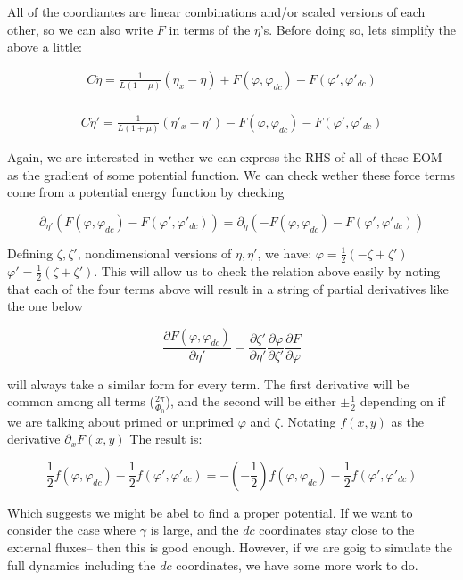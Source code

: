 \documentclass[paper=a4, twocolumn, fontsize=10pt]{article} %
\numberwithin{equation}{section} %
\numberwithin{figure}{section} %
\numberwithin{table}{section} %
\begin{document}
All of the coordiantes are linear combinations and/or scaled versions of each other, so we can also write $F$ in terms of the $\eta$'s. Before doing so, lets simplify the above a little: 

\begin{multline}
    C \ddot{\eta} = \frac{1}{L(1-\mu)} (\eta_x-\eta) + F(\varphi, \varphi_{dc}) - F(\varphi', \varphi'_{dc})
\end{multline}
    \\
\begin{multline}
    C \ddot{\eta}' = \frac{1}{L(1+\mu)} (\eta'_x-\eta') - F(\varphi, \varphi_{dc}) - F(\varphi', \varphi'_{dc})
\end{multline}

Again, we are interested in wether we can express the RHS of all of these EOM as the gradient of some potential function. We can check wether these force terms come from a potential energy function by checking

\[ \partial_{\eta'} \left( F(\varphi, \varphi_{dc}) - F(\varphi', \varphi'_{dc})\right) = \partial_{\eta} \left( -F(\varphi, \varphi_{dc}) - F(\varphi', \varphi'_{dc})\right) \]


Defining $\zeta,\zeta'$, nondimensional versions of $\eta,\eta'$, we have: $\varphi = \frac{1}{2} (-\zeta+\zeta')$ $\varphi' = \frac{1}{2} (\zeta+\zeta')$. This will allow us to check the relation above easily by noting that each of the four terms above will result in a string of partial derivatives like the one below

\[ \frac{\partial F(\varphi,\varphi_{dc})}{\partial \eta'}  =\frac{\partial \zeta'}{\partial \eta'} \frac{\partial \varphi}{\partial \zeta'} \frac{\partial F}{\partial \varphi} \]

will always take a similar form for every term. The first derivative will be common among all terms ($\frac{2\pi}{\Phi_0}$), and the second will be either $\pm \frac{1}{2}$ depending on if we are talking about primed or unprimed $\varphi$ and $\zeta$. Notating $f(x,y)$ as the derivative $\partial_x F(x,y)$ The result is:

\[ \frac{1}{2} f(\varphi, \varphi_{dc}) - \frac{1}{2} f(\varphi', \varphi'_{dc}) = - \left(-\frac{1}{2}\right) f(\varphi, \varphi_{dc}) - \frac{1}{2} f(\varphi', \varphi'_{dc})\]

Which suggests we might be abel to find a proper potential. If we want to consider the case where $\gamma$ is large, and the $dc$ coordinates stay close to the external fluxes-- then this is good enough. However, if we are goig to simulate the full dynamics including the $dc$ coordinates, we have some more work to do.
\end{document}
